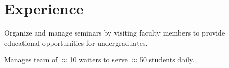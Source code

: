 \documentclass[letterpaper]{deedy-resume} %
\begin{document}
\begin{minipage}[t]{0.58\textwidth} %


\section{Experience}

\vspace{\topsep}
\begin{tightitemize}
\item Organize and manage seminars by visiting faculty members to provide educational opportunities for undergraduates.
\end{tightitemize}

\sectionspace

\vspace{\topsep}
\begin{tightitemize}
\item Manages team of $\approx$10 waiters to serve $\approx$50 students daily.
\end{tightitemize}

\sectionspace









\end{minipage}
\end{document}

